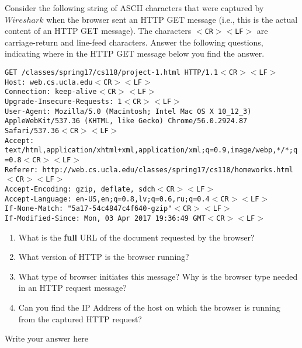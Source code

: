 \documentclass{report}
\begin{document}
\mktitle

\begin{problem}

\newcommand{\ENDL}{$<$CR$>$$<$LF$>$}

Consider the following string of ASCII characters that were captured by $Wireshark$ when the browser sent an HTTP GET message (i.e., this is the actual content of an HTTP GET message). The characters \texttt{\ENDL{}} are carriage-return and line-feed characters. Answer the following questions, indicating where in the HTTP GET message below you find the answer.\\

\begin{raggedright}
\texttt{GET /classes/spring17/cs118/project-1.html HTTP/1.1\ENDL\\
Host: web.cs.ucla.edu\ENDL\\
Connection: keep-alive\ENDL\\
Upgrade-Insecure-Requests: 1\ENDL\\
User-Agent: Mozilla/5.0 (Macintosh; Intel Mac OS X 10\_12\_3) AppleWebKit/537.36 (KHTML, like Gecko) Chrome/56.0.2924.87 Safari/537.36\ENDL\\
Accept: text/html,application/xhtml+xml,application/xml;q=0.9,image/webp,*/*;q=0.8\ENDL\\
Referer: http://web.cs.ucla.edu/classes/spring17/cs118/homeworks.html\ENDL\\
Accept-Encoding: gzip, deflate, sdch\ENDL\\
Accept-Language: en-US,en;q=0.8,lv;q=0.6,ru;q=0.4\ENDL\\
If-None-Match: "5a17-54c4847c4f640-gzip"\ENDL\\
If-Modified-Since: Mon, 03 Apr 2017 19:36:49 GMT\ENDL\\
}
\end{raggedright}

\begin{enumerate}
\item What is the \textbf{full} URL of the document requested by the browser?
\item What version of HTTP is the browser running?
\item What type of browser initiates this message? Why is the browser type needed in an HTTP  request message?
\item Can you find the IP Address of the host on which the browser is running from the captured HTTP request?
\end{enumerate}

\begin{answer}{30em}
    Write your answer here
\end{answer}

\end{problem}
\end{document}

